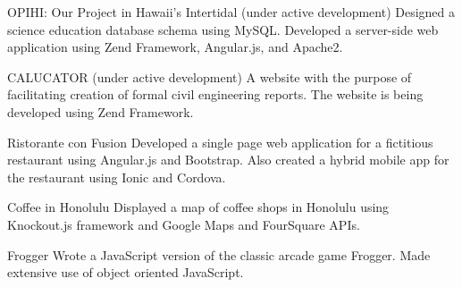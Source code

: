 \begin{cventries}

	\cventry
	{OPIHI: Our Project in Hawaii's Intertidal (under active development)}
	{}
	{}
	{}
	{Designed a science education database schema using MySQL. Developed a server-side web application using Zend Framework, Angular.js, and Apache2.}
	
	\cventry
	{CALUCATOR (under active development)
	}
	{}
	{}
	{}
	{A website with the purpose of facilitating creation of formal civil engineering reports.  The website is being developed using Zend Framework. }

	\cventry
	{Ristorante con Fusion
	}
	{}
	{}
	{}
	{Developed a single page web application for a fictitious restaurant using Angular.js and Bootstrap.  Also created a hybrid mobile app for the restaurant using Ionic and Cordova.}

	\cventry
	{Coffee in Honolulu
	}
	{}
	{}
	{}
	{Displayed a map of coffee shops in Honolulu using Knockout.js framework and Google Maps and FourSquare APIs.}

	\cventry
	{Frogger
	}
	{}
	{}
	{}
	{Wrote a JavaScript version of the classic arcade game Frogger. Made extensive use of object oriented JavaScript.}



\end{cventries}
